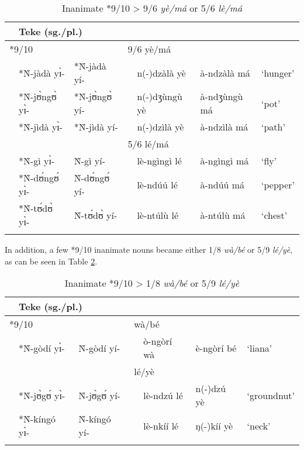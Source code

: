 \documentclass[output=paper,,modfonts,nonflat]{langsci/langscibook-Hyman-et-al}
\begin{document}
\begin{table}[!htbp]
\caption{Inanimate *9/10 > 9/6 \textit{yè/má} or 5/6 \textit{lè/má}}
\label{table12}
\begin{small}
\begin{tabular}{l		l l l  		l		l		l}
\lsptoprule													
\multicolumn{3}{l}{PB (sg./pl.)}					&	\multicolumn{2}{l}{Teke (sg./pl.)}					&		\\
\midrule													
\multicolumn{2}{l}{*9/10}			&		&	\multicolumn{2}{l}{9/6 yè/má}			&		&		\\
	&	*Ǹ-jàdà yɪ̀-	&	*Ǹ-jàdà yí-	&		&	n(-)dzàlà yè	&	à-ndzàlà má	&	`hunger’	\\
	&	*Ǹ-jʊ̀ngʊ̀ yɪ̀-	&	*Ǹ-jʊ̀ngʊ̀ yí-	&		&	n(-)dʒùngù yè	&	à-ndʒùngù má	&	`pot’	\\
	&	*Ǹ-jìdà yɪ̀-	&	*Ǹ-jìdà yí-	&		&	n(-)dzìlà yè	&	à-ndzìlà má	&	`path’	\\	[0.2cm]
	&		&		&	\multicolumn{2}{l}{5/6 lé/má}			&		&		\\
	&	*Ǹ-gì yɪ̀-	&	Ǹ-gì yí-	&		&	lè-ngìngì lé	&	à-ngìngì má	&	`fly’	\\
	&	*Ǹ-dʊ́ngʊ́ yɪ̀-	&	Ǹ-dʊ́ngʊ́ yí-	&		&	lè-ndúú lé	&	à-ndúú má	&	`pepper’	\\
	&	*Ǹ-tʊ́dʊ̀ yɪ̀-	&	Ǹ-tʊ́dʊ̀ yí-	&		&	lè-ntúlù lé	&	à-ntúlù má	&	`chest’	\\
  \lspbottomrule
\end{tabular}
\end{small}
\end{table}

In addition, a few *9/10 inanimate nouns became either 1/8 \textit{wà/bé} or 5/9 \textit{lé/yè}, as can be seen in Table \ref{table13}.

\begin{table}[!htbp]
\caption{Inanimate *9/10 > 1/8 \textit{wà/bé} or 5/9 \textit{lé/yè}}
\label{table13}
\begin{small}
\begin{tabular}{l		l l l  		l		l		l}
\lsptoprule	
\multicolumn{3}{l}{PB (sg./pl.)}					&	\multicolumn{2}{l}{Teke (sg./pl.)}					&		\\
\midrule													
\multicolumn{2}{l}{*9/10}			&		&	\multicolumn{2}{l}{wà/bé}			&		&		\\
	&	*Ǹ-gòdí yɪ̀-	&	Ǹ-gòdí yí-	&		&	ò-ngòrí wà	&	è-ngòrí bé	&	`liana’	\\	[0.2cm]
	&		&		&	\multicolumn{2}{l}{lé/yè}			&		&		\\
	&	*Ǹ-jʊ̀gʊ́ yɪ̀-	&	Ǹ-jʊ̀gʊ́ yí-	&		&	lè-ndzú lé	&	n(-)dzú yè	&	`groundnut’	\\
	&	*Ǹ-kíngó yɪ̀-	&	Ǹ-kíngó yí-	&		&	lè-nkíí lé	&	ŋ(-)kíí yè	&	`neck’	\\												
  \lspbottomrule
\end{tabular}
\end{small}
\end{table}
\end{document}
